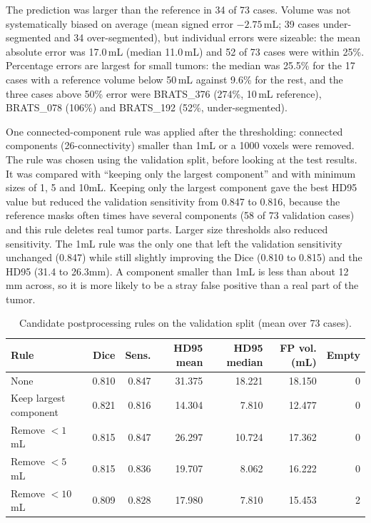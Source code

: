 \documentclass[10pt,a4paper]{article}
\begin{document}
The prediction was larger than the reference in 34 of 73 cases. Volume was not systematically biased on average (mean signed error $-2.75$\,mL; 39 cases under-segmented and 34 over-segmented), but individual errors were sizeable: the mean absolute error was 17.0\,mL (median 11.0\,mL) and 52 of 73 cases were within 25\%. Percentage errors are largest for small tumors: the median was 25.5\% for the 17 cases with a reference volume below 50\,mL against 9.6\% for the rest, and the three cases above 50\% error were BRATS\_376 (274\%, 10\,mL reference), BRATS\_078 (106\%) and BRATS\_192 (52\%, under-segmented).

One connected-component rule was applied after the thresholding: connected components (26-connectivity) smaller than 1mL or a 1000 voxels were removed. The rule was chosen using the validation split, before looking at the test results. It was compared with ``keeping only the largest component'' and with minimum sizes of 1, 5 and 10mL.
Keeping only the largest component gave the best HD95 value but reduced the validation sensitivity from 0.847 to 0.816, because the reference masks often times have several components (58 of 73 validation cases) and this rule deletes real tumor parts. Larger size thresholds also reduced sensitivity. The 1mL rule was the only one that left the validation sensitivity unchanged (0.847) while still slightly improving the Dice (0.810 to 0.815) and the HD95 (31.4 to 26.3mm). A component smaller than 1mL is less than about 12 mm across, so it is more likely to be a stray false positive than a real part of the tumor.

\begin{table}[H]
\centering
\caption{Candidate postprocessing rules on the validation split (mean over 73 cases).}
\small
\begin{tabular}{lrrrrrr}
\toprule
Rule & Dice & Sens. & HD95 mean & HD95 median & FP vol. (mL) & Empty\\
\midrule
None & 0.810 & 0.847 & 31.375 & 18.221 & 18.150 & 0\\
Keep largest component & 0.821 & 0.816 & 14.304 & 7.810 & 12.477 & 0\\
Remove $<1$\,mL & 0.815 & 0.847 & 26.297 & 10.724 & 17.362 & 0\\
Remove $<5$\,mL & 0.815 & 0.836 & 19.707 & 8.062 & 16.222 & 0\\
Remove $<10$\,mL & 0.809 & 0.828 & 17.980 & 7.810 & 15.453 & 2\\
\bottomrule
\end{tabular}
\end{table}
\end{document}
